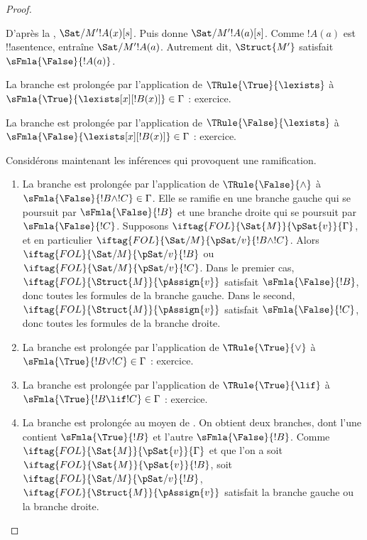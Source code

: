 \documentclass[11pt,a4paper,openany]{memoir}
\begin{document}
\begin{proof}
\begin{enumerate}
{  D'après la ,
  $\Sat/{M'}{!A(x)}[s]$. Puis
   donne
  $\Sat/{M'}{!A(a)}[s]$. Comme $!A(a)$ est !!a{sentence},
   entraîne
  $\Sat/{M'}{!A(a)}$. Autrement dit, $\Struct{M'}$ satisfait
  $\sFmla{\False}{!A(a)}$.
\item La branche est prolongée par l'application de
  $\TRule{\True}{\lexists}$ à
  $\sFmla{\True}{\lexists[x][!B(x)]} \in \Gamma$ : exercice.
\item La branche est prolongée par l'application de
  $\TRule{\False}{\lexists}$ à
  $\sFmla{\False}{\lexists[x][!B(x)]} \in \Gamma$ : exercice.}{}
\end{enumerate}
Considérons maintenant les inférences qui provoquent une ramification.
\begin{enumerate}
\item La branche est prolongée par l'application de
  $\TRule{\False}{\land}$ à
  $\sFmla{\False}{!B \land !C} \in \Gamma$. Elle se ramifie en une
  branche gauche qui se poursuit par $\sFmla{\False}{!B}$ et une
  branche droite qui se poursuit par $\sFmla{\False}{!C}$. Supposons
  $\iftag{FOL}{\Sat{M}}{\pSat{v}}{\Gamma}$, et en particulier
  $\iftag{FOL}{\Sat/{M}}{\pSat/{v}}{!B \land !C}$. Alors
  $\iftag{FOL}{\Sat/{M}}{\pSat/{v}}{!B}$ ou
  $\iftag{FOL}{\Sat/{M}}{\pSat/{v}}{!C}$. Dans le premier cas,
  $\iftag{FOL}{\Struct{M}}{\pAssign{v}}$ satisfait
  $\sFmla{\False}{!B}$, donc toutes les formules de la branche gauche.
  Dans le second,
  $\iftag{FOL}{\Struct{M}}{\pAssign{v}}$ satisfait
  $\sFmla{\False}{!C}$, donc toutes les formules de la branche droite.
\item La branche est prolongée par l'application de
  $\TRule{\True}{\lor}$ à
  $\sFmla{\True}{!B \lor !C} \in \Gamma$ : exercice.
\item La branche est prolongée par l'application de
  $\TRule{\True}{\lif}$ à
  $\sFmla{\True}{!B \lif !C} \in \Gamma$ : exercice.
\item La branche est prolongée au moyen de \Cut{}. On obtient deux
  branches, dont l'une contient $\sFmla{\True}{!B}$ et l'autre
  $\sFmla{\False}{!B}$. Comme
  $\iftag{FOL}{\Sat{M}}{\pSat{v}}{\Gamma}$ et que l'on a soit
  $\iftag{FOL}{\Sat{M}}{\pSat{v}}{!B}$, soit
  $\iftag{FOL}{\Sat/{M}}{\pSat/{v}}{!B}$,
  $\iftag{FOL}{\Struct{M}}{\pAssign{v}}$ satisfait la branche gauche
  ou la branche droite.
\end{enumerate}
\end{proof}
\end{document}
